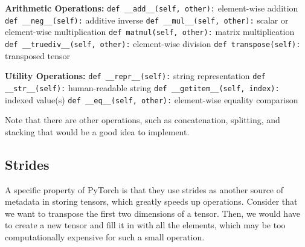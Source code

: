 \begin{algorithm}[H]
\begin{algorithmic}[1]
        \State \textbf{Arithmetic Operations:}
        \State \texttt{def \_\_add\_\_(self, other):}
            \State \hspace{2em}\Return element-wise addition
        \State \texttt{def \_\_neg\_\_(self):}
            \State \hspace{2em}\Return additive inverse
        \State \texttt{def \_\_mul\_\_(self, other):}
            \State \hspace{2em}\Return scalar or element-wise multiplication
        \State \texttt{def matmul(self, other):}
            \State \hspace{2em}\Return matrix multiplication
        \State \texttt{def \_\_truediv\_\_(self, other):}
            \State \hspace{2em}\Return element-wise division
        \State \texttt{def transpose(self):}
            \State \hspace{2em}\Return transposed tensor

        \State \textbf{Utility Operations:}
        \State \texttt{def \_\_repr\_\_(self):}
            \State \hspace{2em}\Return string representation
        \State \texttt{def \_\_str\_\_(self):}
            \State \hspace{2em}\Return human-readable string
        \State \texttt{def \_\_getitem\_\_(self, index):}
            \State \hspace{2em}\Return indexed value(s)
        \State \texttt{def \_\_eq\_\_(self, other):}
            \State \hspace{2em}\Return element-wise equality comparison
    \end{algorithmic}
  \end{algorithm}

  Note that there are other operations, such as concatenation, splitting, and stacking that would be a good idea to implement.  

\subsection{Strides} 

  A specific property of PyTorch is that they use strides as another source of metadata in storing tensors, which greatly speeds up operations. Consider that we want to transpose the first two dimensions of a tensor. Then, we would have to create a new tensor and fill it in with all the elements, which may be too computationally expensive for such a small operation. 

